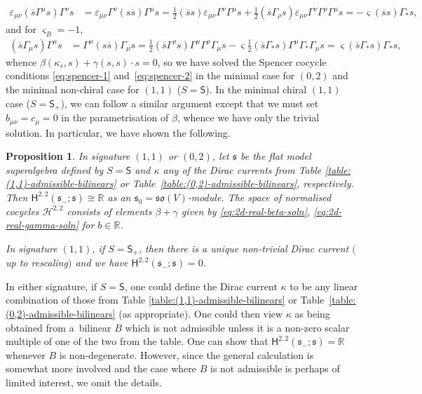 \documentclass[10pt,a4paper]{amsart}
\numberwithin{equation}{section}
\newtheorem{Proposition}[Theorem]{Proposition}
 { \theoremstyle{definition}
\newtheorem{Definition}[Theorem]{Definition}
\newtheorem{Note}[Theorem]{Note}
\newtheorem{Example}[Theorem]{Example}
\newtheorem{Remark}[Theorem]{Remark} }
\newcommand{\fs}{\mathfrak{s}}
\newcommand{\fso}{\mathfrak{so}}
\newcommand{\RR}{\mathbb{R}}
\newcommand{\cH}{\mathcal{H}}
\newcommand{\ssH}{\mathsf{H}}
\newcommand{\ssS}{\mathsf{S}}
\newcommand{\1}{\mathbbm{1}}
\begin{document}
\begin{align*}
	\varepsilon_{\mu\nu}(\overline{s}\Gamma^\mu s)\Gamma^\nu s
		&= \varepsilon_{\mu\nu}\Gamma^\nu (s\overline{s})\Gamma^\mu s	= \frac{1}{2}(\overline{s}s)\varepsilon_{\mu\nu}\Gamma^\nu\Gamma^\mu s
			+ \frac{1}{2}(\overline{s}\Gamma_\rho s)\varepsilon_{\mu\nu}\Gamma^\nu\Gamma^\rho\Gamma^\mu s	= -\varsigma(\overline{s}s)\Gamma_*s,
\end{align*}
and for $\varsigma_B=-1$,
\begin{align*}
	(\overline{s}\Gamma_\mu s)\Gamma^\mu s
		&= \Gamma^\mu (s\overline{s})\Gamma_\mu s	= \frac{1}{2}(\overline{s}\Gamma^\rho s)\Gamma^\mu\Gamma^\rho\Gamma_\mu s - \varsigma\frac{1}{2}(\overline{s}\Gamma_* s)\Gamma^\mu\Gamma_*\Gamma_\mu s	= \varsigma(\overline{s}\Gamma_* s)\Gamma_* s,
\end{align*}
whence $\beta(\kappa_s,s) + \gamma(s,s)\cdot s=0$, so we have solved the Spencer cocycle conditions \eqref{eq:spencer-1} and~\eqref{eq:spencer-2} in the minimal case for $(0,2)$ and the minimal non-chiral case for $(1,1)$ ($S=\ssS$). In the minimal chiral $(1,1)$ case ($S=\ssS_+$), we can follow a similar argument except that we must set $b_{\mu\nu}=c_\mu=0$ in the parametrisation of $\beta$, whence we have only the trivial solution. In particular, we have shown the following.


\begin{Proposition}\label{prop:2d-real-spencer-soln}
	In signature $(1,1)$ or $(0,2)$, let $\fs$ be the flat model superalgebra defined by ${S=\ssS}$ and $\kappa$ any of the Dirac currents from Table {\rm\ref{table:(1,1)-admissible-bilinears}} or Table~{\rm\ref{table:(0,2)-admissible-bilinears}}, respectively. Then
${\ssH^{2,2}(\fs_-;\fs) \cong \RR}$
	as an $\fs_0=\fso(V)$-module. The space of normalised cocycles $\cH^{2,2}$ consists of elements $\beta+\gamma$ given by \eqref{eq:2d-real-beta-soln}, \eqref{eq:2d-real-gamma-soln} for $b\in\RR$.
	
In signature $(1,1)$, if $S=\ssS_+$, then there is a unique non-trivial Dirac current $($up to rescaling$)$ and we have
$\ssH^{2,2}(\fs_-;\fs) = 0$.
\end{Proposition}


In either signature, if $S=\ssS$, one could define the Dirac current $\kappa$ to be any linear combination of those from Table \ref{table:(1,1)-admissible-bilinears} or Table~\ref{table:(0,2)-admissible-bilinears} (as appropriate). One could then view $\kappa$ as being obtained from a~bilinear $B$ which is not admissible unless it is a non-zero scalar multiple of one of the two from the table. One can show that $\ssH^{2,2}(\fs_-;\fs)=\RR$ whenever $B$ is non-degenerate. However, since the general calculation is somewhat more involved and the case where $B$ is not admissible is perhaps of limited interest, we omit the details.
\end{document}
